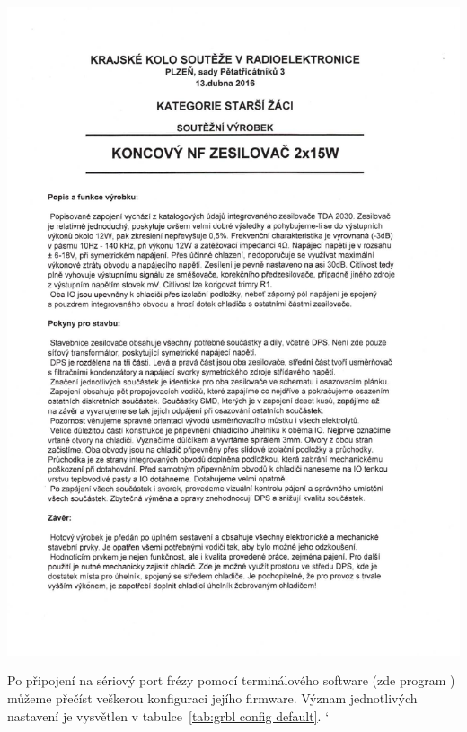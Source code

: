 \noindent
\includegraphics[page=2, clip, bb=20mm 89mm 175mm 270mm, width=1.0\textwidth]{prilohy/TDA2030-dokumentace.pdf}



\clearpage
{}
Po připojení na sériový port frézy pomocí terminálového software (zde program
) můžeme přečíst veškerou konfiguraci jejího firmware. Význam
jednotlivých nastavení je vysvětlen v tabulce~\vref{tab:grbl config default}.
\begingroup
\catcode`

\endgroup

